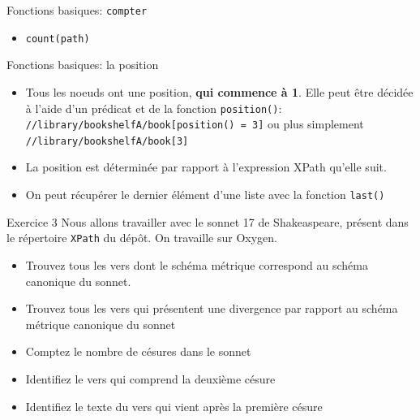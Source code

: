 \documentclass[11pt,aspectratio=169]{beamer}
\begin{document}
\begin{frame}{Fonctions basiques: \texttt{compter}}
\begin{itemize}
\item \texttt{count(path)}
\end{itemize}
\end{frame}

\begin{frame}{Fonctions basiques: la position}
\begin{itemize}
\item Tous les noeuds ont une position, \textbf{qui commence à 1}. Elle peut être décidée à l'aide d'un prédicat et de la fonction \texttt{position()}: \texttt{//library/bookshelfA/book[position() = 3]} ou plus simplement \texttt{//library/bookshelfA/book[3]}
\item La position est déterminée par rapport à l'expression XPath qu'elle suit.
\item On peut récupérer le dernier élément d'une liste avec la fonction \texttt{last()}
\end{itemize}
\end{frame}


\begin{frame}{Exercice 3}
Nous allons travailler avec le sonnet 17 de Shakeaspeare, présent dans le répertoire \texttt{XPath} du dépôt. On travaille sur Oxygen.
\begin{itemize}
\item Trouvez tous les vers dont le schéma métrique correspond au schéma canonique du sonnet.
\item Trouvez tous les vers qui présentent une divergence par rapport au schéma métrique canonique du sonnet
\item Comptez le nombre de césures dans le sonnet
\item Identifiez le vers qui comprend la deuxième césure
\item Identifiez le texte du vers qui vient après la première césure
\end{itemize}
\end{frame}




\end{document}
